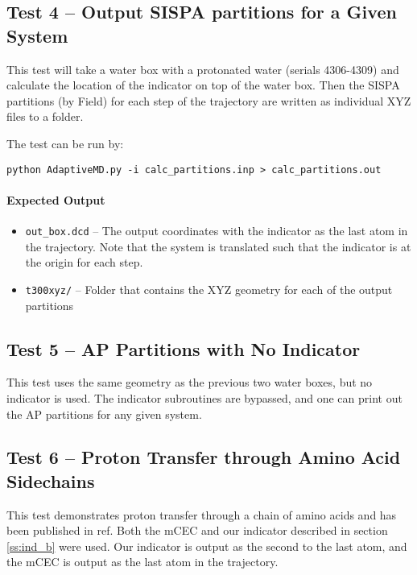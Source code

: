 \documentclass{article}
\begin{document}
\subsection{Test 4 -- Output SISPA partitions for a Given System}
This test will take a water box with a protonated water (serials 4306-4309) and calculate the location of the indicator on top of the water box.
Then the SISPA partitions (by Field\cite{Field2017}) for each step of the trajectory are written as individual XYZ files to a folder.

The test can be run by:

\texttt{python AdaptiveMD.py -i calc\_partitions.inp > calc\_partitions.out}

\paragraph{Expected Output}
\begin{itemize}
\item \texttt{out\_box.dcd} -- The output coordinates with the indicator as the last atom in the trajectory.
Note that the system is translated such that the indicator is at the origin for each step.
\item \texttt{t300xyz/} -- Folder that contains the XYZ geometry for each of the output partitions
\end{itemize}

\subsection{Test 5 -- AP Partitions with No Indicator}
This test uses the same geometry as the previous two water boxes, but no indicator is used.
The indicator subroutines are bypassed, and one can print out the AP partitions for any given system.

\subsection{Test 6 -- Proton Transfer through Amino Acid Sidechains}
This test demonstrates proton transfer through a chain of amino acids and has been published in ref\cite{Duster2019}.
Both the mCEC and our indicator described in section \ref{ss:ind_b} were used.
Our indicator is output as the second to the last atom, and the mCEC is output as the last atom in the trajectory.
\end{document}
